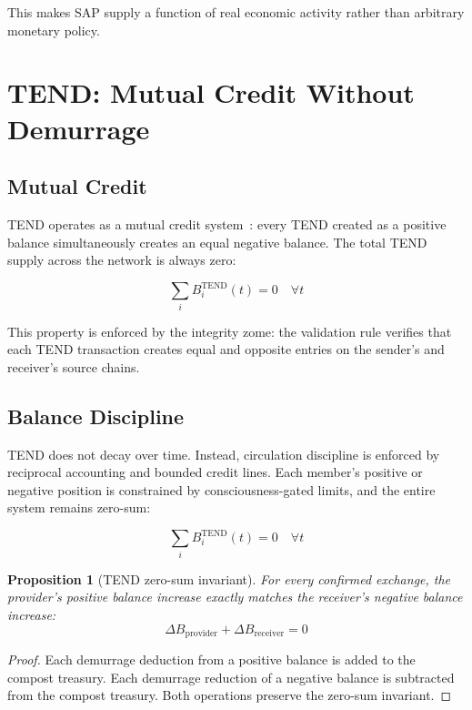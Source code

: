 \documentclass[11pt,twocolumn]{article}
\newtheorem{proposition}{Proposition}
\begin{document}
This makes SAP supply a function of real economic activity rather than
arbitrary monetary policy.

\section{TEND: Mutual Credit Without Demurrage}

\subsection{Mutual Credit}

TEND operates as a mutual credit system~\cite{riegel1944}: every TEND
created as a positive balance simultaneously creates an equal negative
balance. The total TEND supply across the network is always zero:

\begin{equation}
  \sum_{i} B_i^{\text{TEND}}(t) = 0 \quad \forall t
\end{equation}

This property is enforced by the integrity zome: the validation rule
verifies that each TEND transaction creates equal and opposite entries
on the sender's and receiver's source chains.

\subsection{Balance Discipline}

TEND does not decay over time. Instead, circulation discipline is enforced by
reciprocal accounting and bounded credit lines. Each member's positive or
negative position is constrained by consciousness-gated limits, and the entire
system remains zero-sum:

\begin{equation}
  \sum_{i} B_i^{\text{TEND}}(t) = 0 \quad \forall t
\end{equation}

\begin{proposition}[TEND zero-sum invariant]
For every confirmed exchange, the provider's positive balance increase exactly
matches the receiver's negative balance increase:
\begin{equation}
  \Delta B_{\text{provider}} + \Delta B_{\text{receiver}} = 0
\end{equation}
\end{proposition}

\begin{proof}
Each demurrage deduction from a positive balance is added to the compost
treasury. Each demurrage reduction of a negative balance is subtracted
from the compost treasury. Both operations preserve the zero-sum invariant.
\end{proof}
\end{document}
